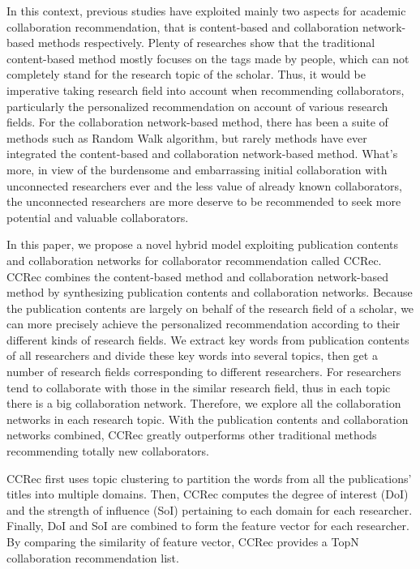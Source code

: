 \documentclass{acm_proc_article-sp}
\begin{document}
In this context, previous studies have exploited mainly two aspects for academic collaboration recommendation, that is content-based and collaboration network-based methods respectively. Plenty of researches show that the traditional content-based method mostly focuses on the tags made by people, which can not completely stand for the research topic of the scholar. Thus, it would be imperative taking research field into account when recommending collaborators, particularly the personalized recommendation on account of various research fields. For the collaboration network-based method, there has been a suite of methods such as Random Walk algorithm, but rarely methods have ever integrated the content-based and collaboration network-based method. What's more, in view of the burdensome and embarrassing initial collaboration with unconnected researchers ever and the less value of already known collaborators, the unconnected researchers are more deserve to be recommended to seek more potential and valuable collaborators.

In this paper, we propose a novel hybrid model exploiting publication contents and collaboration networks for collaborator recommendation called CCRec. CCRec combines the content-based method and collaboration network-based method by synthesizing publication contents and collaboration networks. Because the publication contents are largely on behalf of the research field of a scholar, we can more precisely achieve the personalized recommendation according to their different kinds of research fields. We extract key words from publication contents of all researchers and divide these key words into several topics, then get a number of research fields corresponding to different researchers. For researchers tend to collaborate with those in the similar research field, thus in each topic there is a big collaboration network. Therefore, we explore all the collaboration networks in each research topic. With the publication contents and collaboration networks combined, CCRec greatly outperforms other traditional methods recommending totally new collaborators.

CCRec first uses topic clustering to partition the words from all the publications' titles into multiple domains. Then, CCRec computes the degree of interest (DoI) and the strength of influence (SoI) pertaining to each domain for each researcher. Finally, DoI and SoI are combined to form the feature vector for each researcher. By comparing the similarity of feature vector, CCRec provides a TopN collaboration recommendation list.
\end{document}
